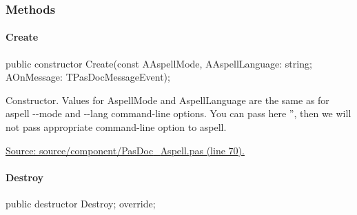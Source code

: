 \documentclass{report}
\newif\ifpdf
\begin{document}
\subsubsection*{\large{\textbf{Methods}}\normalsize\hspace{1ex}\hfill}
\paragraph*{Create}\hspace*{\fill}

\label{PasDoc_Aspell.TAspellProcess-Create}
\begin{list}{}{
\setlength{\itemindent}{0cm}
\setlength{\listparindent}{0cm}
\setlength{\leftmargin}{\evensidemargin}
\addtolength{\leftmargin}{\tmplength}
\settowidth{\labelsep}{X}
\addtolength{\leftmargin}{\labelsep}
\setlength{\labelwidth}{\tmplength}
}
\item[\textbf{Declaration}\hfill]
\ifpdf
\begin{flushleft}
\fi
\begin{ttfamily}
public constructor Create(const AAspellMode, AAspellLanguage: string; AOnMessage: TPasDocMessageEvent);\end{ttfamily}

\ifpdf
\end{flushleft}
\fi

\par
\item[\textbf{Description}]
Constructor. Values for AspellMode and AspellLanguage are the same as for aspell {-}{-}mode and {-}{-}lang command{-}line options. You can pass here '', then we will not pass appropriate command{-}line option to aspell.\par
\href{https://github.com/pasdoc/pasdoc/blob/master/source/component/PasDoc_Aspell.pas#L70}{Source: source/component/PasDoc{\_}Aspell.pas (line 70).}

\end{list}
\paragraph*{Destroy}\hspace*{\fill}

\label{PasDoc_Aspell.TAspellProcess-Destroy}
\begin{list}{}{
\setlength{\itemindent}{0cm}
\setlength{\listparindent}{0cm}
\setlength{\leftmargin}{\evensidemargin}
\addtolength{\leftmargin}{\tmplength}
\settowidth{\labelsep}{X}
\addtolength{\leftmargin}{\labelsep}
\setlength{\labelwidth}{\tmplength}
}
\item[\textbf{Declaration}\hfill]
\ifpdf
\begin{flushleft}
\fi
\begin{ttfamily}
public destructor Destroy; override;\end{ttfamily}

\ifpdf
\end{flushleft}
\fi

\end{list}
\end{document}
